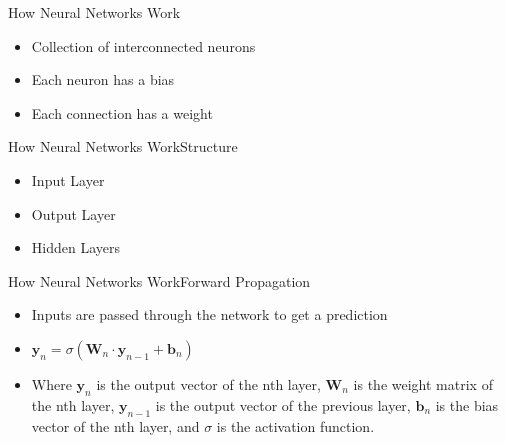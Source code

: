 \documentclass{beamer}
\begin{document}

\begin{frame}{How Neural Networks Work}
    \begin{itemize}
        \item Collection of interconnected neurons
        \item Each neuron has a bias
        \item Each connection has a weight
    \end{itemize}
\end{frame}



\begin{frame}{How Neural Networks Work}{Structure}
    \begin{itemize}
        \item Input Layer
        \item Output Layer
        \item Hidden Layers
    \end{itemize}
\end{frame}

\begin{frame}{How Neural Networks Work}{Forward Propagation}
    \begin{itemize}
        \item Inputs are passed through the network to get a prediction
        \item $\textbf{y}_n=\sigma{(\textbf{W}_n\cdot\textbf{y}_{n-1} + \textbf{b}_n)}$
        \item Where $\textbf{y}_n$ is the output vector of the nth layer, $\textbf{W}_n$ is the weight matrix of the nth layer, $\textbf{y}_{n-1}$ is the output vector of the previous layer, $\textbf{b}_n$ is the bias vector of the nth layer, and $\sigma$ is the activation function.
    \end{itemize}
\end{frame}
\end{document}
